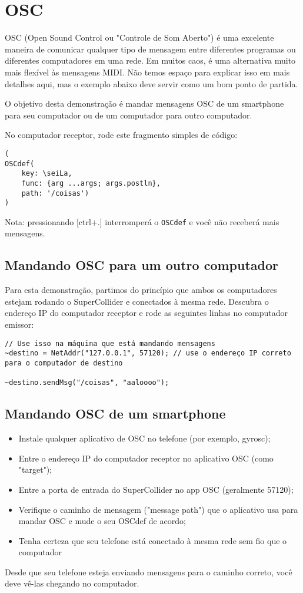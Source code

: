 \section{OSC}

OSC (Open Sound Control ou "Controle de Som Aberto") é uma excelente maneira de comunicar qualquer tipo de mensagem entre diferentes programas ou diferentes computadores em uma rede. Em muitos caos, é uma alternativa muito mais flexível às mensagens MIDI. Não temos espaço para explicar isso em mais detalhes aqui, mas o exemplo abaixo deve servir como um bom ponto de partida.

O objetivo desta demonstração é mandar mensagens OSC de um smartphone para seu computador ou de um computador para outro computador.

No computador receptor, rode este fragmento simples de código:

\bigskip
\begin{lstlisting}[style=SuperCollider-IDE, basicstyle=\scttfamily\footnotesize]
(
OSCdef(
	key: \seiLa,
	func: {arg ...args; args.postln},
	path: '/coisas')
)
\end{lstlisting}

Nota: pressionando [ctrl+.] interromperá o \texttt{OSCdef} e você não receberá mais mensagens.

\subsection{Mandando OSC para um outro computador}

Para esta demonstração, partimos do princípio que ambos os computadores estejam rodando o SuperCollider e conectados à mesma rede. Descubra o endereço IP do computador receptor e rode as seguintes linhas no computador emissor:

\begin{lstlisting}[style=SuperCollider-IDE, basicstyle=\scttfamily\footnotesize]
// Use isso na máquina que está mandando mensagens
~destino = NetAddr("127.0.0.1", 57120); // use o endereço IP correto para o computador de destino

~destino.sendMsg("/coisas", "aaloooo");
\end{lstlisting}

\subsection{Mandando OSC de um smartphone}

\begin{itemize}
\item Instale qualquer aplicativo de OSC no telefone (por exemplo, gyrosc);
\item Entre o endereço IP do computador receptor no aplicativo OSC (como "target");
\item Entre a porta de entrada do SuperCollider no app OSC (geralmente 57120);
\item Verifique o caminho de mensagem ("message path") que o aplicativo usa para mandar OSC e mude o seu OSCdef de acordo;
\item Tenha certeza que seu telefone está conectado à mesma rede sem fio que o computador
\end{itemize}

Desde que seu telefone esteja enviando mensagens para o caminho correto, você deve vê-las chegando no computador.
